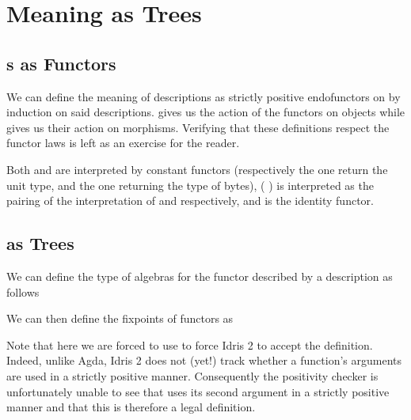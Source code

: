 \documentclass{article}
\newcommand{\idris}{Idris 2}
\newcommand{\assertTotal}{\IdrisPostulate{assert\KatlaUnderscore{}total}}
\begin{document}
\section{Meaning as Trees}

\subsection{s as Functors}

We can define the meaning of descriptions as strictly positive
endofunctors on  by induction on said descriptions.
%
 gives us the action of the functors on objects
while  gives us their action on morphisms.
%
Verifying that these definitions respect the functor laws is left as
an exercise for the reader.

Both  and  are interpreted by constant
functors (respectively the one return the unit type, and the one returning
the type of bytes),
%
(  ) is interpreted as the
pairing of the interpretation of  and  respectively,
%
and  is the identity functor.





\subsection{ as Trees}

We can define the type of algebras for the functor described by a
 description as follows


We can then define the fixpoints of functors as



%
Note that here we are forced to use \assertTotal{} to force \idris{}
to accept the definition.
%
Indeed, unlike Agda, \idris{} does not (yet!) track whether a function's
arguments are used in a strictly positive manner.
%
Consequently the positivity checker
is unfortunately unable to see that  uses its second
argument in a strictly positive manner
and that this is therefore a legal definition.
\end{document}
